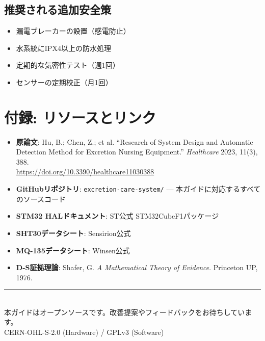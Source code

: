 \documentclass[a4paper,11pt]{article}
\begin{document}
\subsection{推奨される追加安全策}

\begin{itemize}[leftmargin=2em]
  \item 漏電ブレーカーの設置（感電防止）
  \item 水系統にIPX4以上の防水処理
  \item 定期的な気密性テスト（週1回）
  \item センサーの定期校正（月1回）
\end{itemize}

\vspace{10mm}

\section{付録: リソースとリンク}

\begin{itemize}[leftmargin=2em]
  \item \textbf{原論文}: Hu, B.; Chen, Z.; et al. ``Research of System Design and Automatic Detection Method for Excretion Nursing Equipment.'' \textit{Healthcare} 2023, 11(3), 388. \\ \url{https://doi.org/10.3390/healthcare11030388}
  \item \textbf{GitHubリポジトリ}: \texttt{excretion-care-system/} --- 本ガイドに対応するすべてのソースコード
  \item \textbf{STM32 HALドキュメント}: ST公式 STM32CubeF1パッケージ
  \item \textbf{SHT30データシート}: Sensirion公式
  \item \textbf{MQ-135データシート}: Winsen公式
  \item \textbf{D-S証拠理論}: Shafer, G. \textit{A Mathematical Theory of Evidence}. Princeton UP, 1976.
\end{itemize}

\vfill
\begin{center}
\rule{0.5\textwidth}{0.4pt}\\[6pt]
{\small 本ガイドはオープンソースです。改善提案やフィードバックをお待ちしています。}\\
{\small CERN-OHL-S-2.0 (Hardware) / GPLv3 (Software)}
\end{center}
\end{document}
